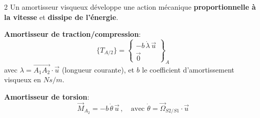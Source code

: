 \documentclass[10pt,a4paper]{article}
\renewcommand{\vec}{\overrightarrow}
\begin{document}
\begin{multicols}{2}
            Un amortisseur visqueux développe une action mécanique \textbf{proportionnelle à la vitesse} et \textbf{dissipe de l'énergie}.

            \textbf{Amortisseur de traction/compression}:
            \[
            \{T_{A/2}\} = \begin{Bmatrix} -b\,\dot{\lambda}\,\vec{u} \\ \vec{0} \end{Bmatrix}_A
            \]
            avec $\lambda = \overrightarrow{A_1A_2}\cdot\vec{u}$ (longueur courante), et $b$ le coefficient d'amortissement visqueux en $ N s / m $.

            \textbf{Amortisseur de torsion}:
            \[
            \vec{M}_{A_2} = -b\,\dot{\theta}\,\vec{u}\, , \quad \text{avec } \dot{\theta} = \vec{\Omega}_{S2/S1}\cdot\vec{u}
            \]
            
        \end{multicols}
\end{document}
